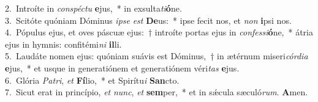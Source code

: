 {2.~}Introíte in \textit{con}\textit{spé}\textit{ctu} \textbf{e}jus,~* in exsulta\textit{ti}\textbf{ó}ne.\\
{3.~}Scitóte quóniam Dóminus \textit{i}\textit{pse} \textit{est} \textbf{De}us:~* ipse fecit nos, et \textit{non} \textbf{i}psi nos.\\
{4.~}Pópulus ejus, et oves páscuæ ejus:~† introíte portas ejus in \textit{con}\textit{fes}\textit{si}\textbf{ó}ne,~* átria ejus in hymnis: confitémi\textit{ni} \textbf{il}li.\\
{5.~}Laudáte nomen ejus: quóniam suávis est Dóminus,~† in ætérnum miseri\textit{cór}\textit{di}\textit{a} \textbf{e}jus,~* et usque in generatiónem et generatiónem véri\textit{tas} \textbf{e}jus.\\
{6.~}Glória \textit{Pa}\textit{tri}, \textit{et} \textbf{Fí}lio,~* et Spirítu\textit{i} \textbf{San}cto.\\
{7.~}Sicut erat in princípio, \textit{et} \textit{nunc}, \textit{et} \textbf{sem}per,~* et in sǽcula sæculó\textit{rum}. \textbf{A}men.\\
